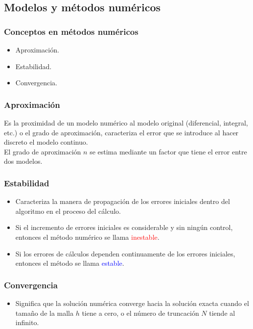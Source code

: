 \subsection{Modelos y métodos numéricos}
\begin{frame}
\frametitle{Conceptos en métodos numéricos}
\begin{itemize}[<+->]
\item Aproximación.
\item Estabilidad.
\item Convergencia.
\end{itemize}
\end{frame}
\begin{frame}
\frametitle{Aproximación}
Es la proximidad de un modelo numérico al modelo original (diferencial, integral, etc.) o el
grado de aproximación, caracteriza el error que se introduce al hacer discreto el modelo
continuo.
\\
\bigskip
El grado de aproximación $n$ se estima mediante un factor que tiene el error entre dos modelos.
\end{frame}
\begin{frame}
\frametitle{Estabilidad}
\begin{itemize}[<+->]
\item Caracteriza la manera de propagación de los errores iniciales dentro del algoritmo en el
proceso del cálculo.
\item Si el incremento de errores iniciales es considerable y sin ningún control, entonces el
método numérico se llama \textcolor{red}{inestable}.
\item Si los errores de cálculos dependen continuamente de los errores iniciales, entonces el método se llama \textcolor{blue}{estable}.
\end{itemize}
\end{frame}
\begin{frame}
\frametitle{Convergencia}
\begin{itemize}
\item  Significa que la solución numérica converge hacia la solución exacta cuando el tamaño de la malla $h$ tiene a cero, o el número de truncación $N$ tiende al infinito.
\end{itemize}
\end{frame}
